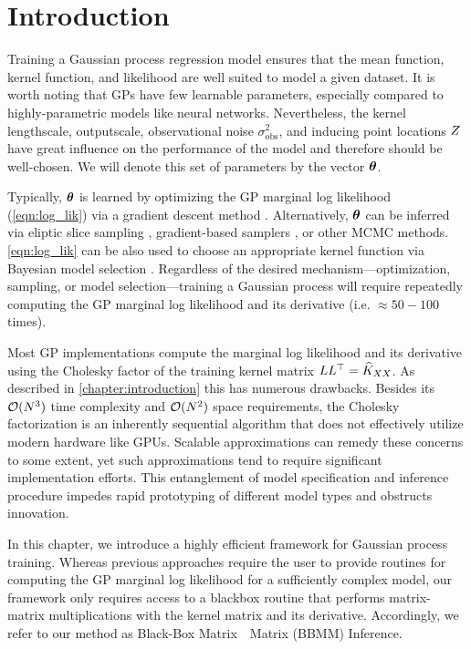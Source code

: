 \section{Introduction}

Training a Gaussian process regression model ensures that the mean function, kernel function, and likelihood are well suited to model a given dataset.
It is worth noting that GPs have few learnable parameters, especially compared to highly-parametric models like neural networks.
Nevertheless, the kernel lengthscale, outputscale, observational noise $\sigma^2_\text{obs}$, and inducing point locations $Z$ have great influence on the performance of the model and therefore should be well-chosen.
We will denote this set of parameters by the vector $\boldsymbol{\theta}$.

Typically, $\boldsymbol{\theta}$ is learned by optimizing the GP marginal log likelihood (\cref{eqn:log_lik}) via a gradient descent method \cite{rasmussen2006gaussian}.
Alternatively, $\boldsymbol{\theta}$ can be inferred via eliptic slice sampling \cite{murray2010elliptical}, gradient-based samplers \cite{havasi2018inference}, or other MCMC methods.
\cref{eqn:log_lik} can be also used to choose an appropriate kernel function via Bayesian model selection \cite{rasmussen2006gaussian,duvenaud2013structure}.
Regardless of the desired mechanism---optimization, sampling, or model selection---training a Gaussian process will require repeatedly computing the GP marginal log likelihood and its derivative (i.e. $\approx50-100$ times).

Most GP implementations compute the marginal log likelihood and its derivative using the Cholesky factor of the training kernel matrix $L L^\top = \widehat{K}_{XX}$.
As described in \cref{chapter:introduction} this has numerous drawbacks.
Besides its $\bigo{N^3}$ time complexity and $\bigo{N^2}$ space requirements, the Cholesky factorization is an inherently sequential algorithm that does not effectively utilize modern hardware like GPUs.
Scalable approximations can remedy these concerns to some extent, yet such approximations tend to require significant implementation efforts.
This entanglement of model specification and inference procedure impedes rapid prototyping of different model types and obstructs innovation.

In this chapter, we introduce a highly efficient framework for Gaussian process training.
Whereas previous approaches require the user to provide routines for computing the GP marginal log likelihood for a sufficiently complex model,
our framework only requires access to a blackbox routine that performs matrix-matrix multiplications with the kernel matrix and its derivative.
Accordingly, we refer to our method as Black-Box Matrix~\texttimes~Matrix (BBMM) Inference.

